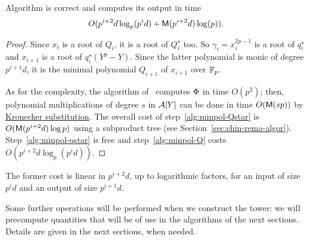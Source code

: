 \begin{theorem}
  Algorithm 
  is correct and computes its output in time
  \begin{equation}
    O( p^{i+2}d\log_p(p^id)+\mathsf{M}(p^{i+2}d)\log(p))
    \text{.}    
  \end{equation}
\end{theorem}
\begin{proof}
  Since $x_i$ is a root of $Q_i$, it is a root of $Q_i^\star$ too. So
  $\gamma_i=x_i^{2p-1}$ is a root of $q_i^\star$ and $x_{i+1}$ is a
  root of $q_i^\star(Y^p-Y)$. Since the latter polynomial is monic of
  degree $p^{i+1}d$, it is the minimal polynomial $Q_{i+1}$ of
  $x_{i+1}$ over $\mathbb{F}_p$.

  As for the complexity, the algorithm of~\cite{brent93} computes
  $\Phi$ in time $O(p^2)$; then, polynomial multiplications of
  degree $s$ in $\mathcal{A}[Y]$ can be done in time $O(\mathsf{M}(sp))$ by
  \hyperref[sec:mult-polyn]{Kronecker substitution}. The overall cost
  of step~\ref{alg:minpol-Qstar} is $O(\mathsf{M}(p^{i+2}d)\log p)$ using a
  subproduct tree (see
  Section~\ref{sec:chin-rema-algor}). Step~\ref{alg:minpol-qstar} is
  free and step~\ref{alg:minpol-Q} costs $O(p^{i+2}d\log_p(p^id))$.
\end{proof}

The former cost is linear in $p^{i+2}d$, up to logarithmic factors,
for an input of size $p^id$ and an output of size $p^{i+1}d$.

Some further operations will be performed when we construct the tower:
we will precompute quantities that will be of use in the algorithms of
the next sections. Details are given in the next sections, when
needed.


%
